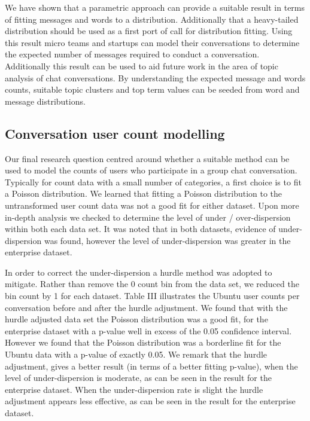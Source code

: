 \documentclass[conference]{IEEEtran}
\begin{document}
We have shown that a parametric approach can provide a suitable result in terms of fitting messages and words to a distribution. Additionally that a heavy-tailed distribution should be used as a first port of call for distribution fitting. Using this result micro teams and startups can model their conversations to determine the expected number of messages required to conduct a conversation. Additionally this result can be used to aid future work in the area of topic analysis of chat conversations. By understanding the expected message and words counts, suitable topic clusters and top term values can be seeded from word and message distributions.

\subsection{Conversation user count modelling}

Our final research question centred around whether a suitable method can be used to model the counts of users who participate in a group chat conversation. Typically for count data with a small number of categories, a first choice is to fit a Poisson distribution. We learned that fitting a Poisson distribution to the untransformed user count data was not a good fit for either dataset. Upon more in-depth analysis we checked to determine the level of under / over-dispersion within both each data set. It was noted that in both datasets, evidence of under-dispersion was found, however the level of under-dispersion was greater in the enterprise dataset. 

In order to correct the under-dispersion a hurdle method was adopted to mitigate. Rather than remove the 0 count bin from the data set, we reduced the bin count by 1 for each dataset. Table III illustrates the Ubuntu user counts per conversation before and after the hurdle adjustment. We found that with the hurdle adjusted data set the Poisson distribution was a good fit, for the enterprise dataset with a p-value well in excess of the 0.05 confidence interval. However we found that the Poisson distribution was a borderline fit for the Ubuntu data with a p-value of exactly 0.05. We remark that the hurdle adjustment, gives a better result (in terms of a better fitting p-value), when the level of under-dispersion is moderate, as can be seen in the result for the enterprise dataset. When the under-dispersion rate is slight the hurdle adjustment appears less effective, as can be seen in the result for the enterprise dataset.
\end{document}
